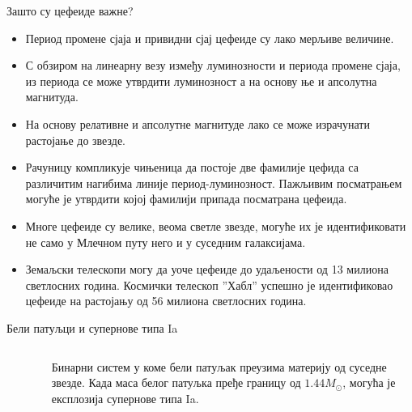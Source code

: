 \documentclass[aspectratio=169, xcolor=table, 10pt]{beamer}
\begin{document}
\begin{frame}{Зашто су цефеиде важне?}
  \begin{itemize}
    \item Период промене сјаја и привидни сјај цефеиде су лако мерљиве величине.
    \item С обзиром на линеарну везу између луминозности и периода промене сјаја, из периода се може утврдити луминозност а на основу ње и апсолутна магнитуда.
    \item На основу релативне и апсолутне магнитуде лако се може израчунати растојање до звезде.
    \item Рачуницу компликује чињеница да постоје две фамилије цефида са различитим нагибима линије период-луминозност. Пажљивим посматрањем могуће је утврдити којој фамилији припада посматрана цефеида.
    \item Многе цефеиде су велике, веома светле звезде, могуће их је идентификовати не само у Млечном путу него и у суседним галаксијама.
    \item Земаљски телескопи могу да уоче цефеиде до удаљености од 13 милиона светлосних година. Космички телескоп ”Хабл” успешно је идентификовао цефеиде на растојању од 56 милиона светлосних година.
  \end{itemize}
\end{frame}

\begin{frame}{Бели патуљци и супернове типа Ia}
  \begin{columns}[T]
    \begin{column}{0.7\textwidth}
      \begin{figure}
        \centering
        \vspace{-1em}
      \end{figure}
    \end{column}
    \begin{column}{0.3\textwidth}
      Бинарни систем у коме бели патуљак преузима материју од суседне звезде. Када маса белог патуљка пређе границу од $1.44 M_{\odot}$, могућа је експлозија супернове типа Ia.
    \end{column}
  \end{columns}
\end{frame}
\end{document}

